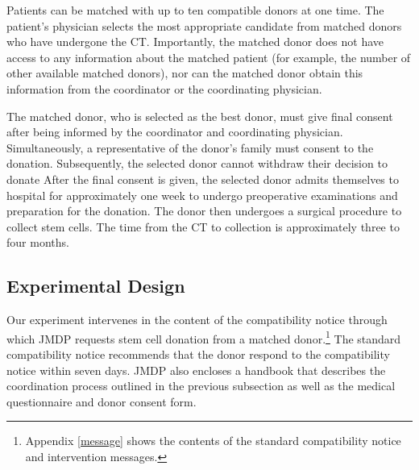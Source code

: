 \documentclass[12pt, a4paper]{article}
\begin{document}
Patients can be matched with up to ten compatible donors at one time. The patient's physician selects the most appropriate candidate from matched donors who have undergone the CT. Importantly, the matched donor does not have access to any information about the matched patient (for example, the number of other available matched donors), nor can the matched donor obtain this information from the coordinator or the coordinating physician.

The matched donor, who is selected as the best donor, must give final consent after being informed by the coordinator and coordinating physician. Simultaneously, a representative of the donor's family must consent to the donation. Subsequently, the selected donor cannot withdraw their decision to donate After the final consent is given, the selected donor admits themselves to hospital for approximately one week to undergo preoperative examinations and preparation for the donation. The donor then undergoes a surgical procedure to collect stem cells. The time from the CT to collection is approximately three to four months.

\hypertarget{design}{%
\subsection{Experimental Design}\label{design}}

Our experiment intervenes in the content of the compatibility notice through which JMDP requests stem cell donation from a matched donor.\footnote{Appendix \ref{message} shows the contents of the standard compatibility notice and intervention messages.} The standard compatibility notice recommends that the donor respond to the compatibility notice within seven days. JMDP also encloses a handbook that describes the coordination process outlined in the previous subsection as well as the medical questionnaire and donor consent form.
\end{document}
